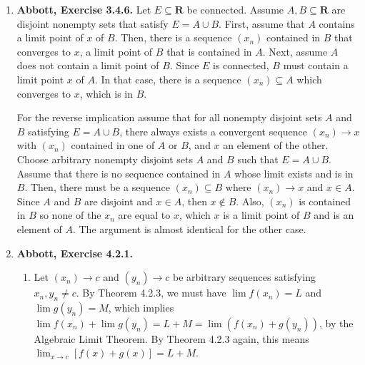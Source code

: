 \documentclass{article}
\makeatletter
\DeclarePairedDelimiter\abs{\lvert}{\rvert}
\let\oldabs\abs
\def\abs{\@ifstar{\oldabs}{\oldabs*}}
\newcommand{\N}{\mathbf{N}}
\newcommand{\R}{\mathbf{R}}
\newcommand{\set}[1]{\{#1\}}
\newcommand{\exc}[2][Abbott]{\item \textbf{#1, Exercise #2.}}
\makeatother
\begin{document}
\begin{enumerate}
\begin{enumerate}
        \item  Each $I_n$ contains some $x_n \in K$, otherwise their intersection with it would be empty, thus it could be finitely covered. Since $(\abs{I_n}) \to 0$, the sequence $(x_n)$ is Cauchy, so it must converge to some $x$. Then, we can use the fact that $K$ is closed to conclude that $x \in K$, by Theorem 3.2.8. Since $K \subseteq I_0$, it follows that $x \in I_0$. Also, since $I_n \subseteq I_0$ for each $n \in \N$, $x \in I_n$.
        
        \item Since $x \in O_{\lambda_0}$ and $O_{\lambda_0}$ is open, there is some $\epsilon_0 > 0$ such that $V_{\epsilon_0}(x) \subseteq O_{\lambda_0}$. Since $\lim \abs{I_n} = 0$, there must be some $N \in \N$ such that $\abs{I_N} < \epsilon_0/2$. But we've already shown that $x \in I_N$, so $I_N \subseteq V_{\epsilon_0}(x) \subseteq O_{\lambda_0}$, therefore $\set{O_{\lambda_0}}$ is a finite subcover for $K \cap I_N$, contradicting the assumption that none of the $K \cap I_n$'s can be finitely subcovered.
    \end{enumerate}
    
    \exc{3.4.6}
    Let $E \subseteq \R$ be connected. Assume $A,B \subseteq \R$ are disjoint nonempty sets that satisfy $E = A \cup B$. First, assume that $A$ contains a limit point of $x$ of $B$. Then, there is a sequence $(x_n)$ contained in $B$ that converges to $x$, a limit point of $B$ that is contained in $A$. Next, assume $A$ does not contain a limit point of $B$. Since $E$ is connected, $B$ must contain a limit point $x$ of $A$. In that case, there is a sequence $(x_n) \subseteq A$ which converges to $x$, which is in $B$.
    
    For the reverse implication assume that for all nonempty disjoint sets $A$ and $B$ satisfying $E = A \cup B$, there always exists a convergent sequence $(x_n) \to x$ with $(x_n)$ contained in one of $A$ or $B$, and $x$ an element of the other. Choose arbitrary nonempty disjoint sets $A$ and $B$ such that $E = A \cup B$. Assume that there is no sequence contained in $A$ whose limit exists and is in $B$. Then, there must be a sequence $(x_n) \subseteq B$ where $(x_n) \to x$ and $x \in A$. Since $A$ and $B$ are disjoint and $x \in A$, then $x \notin B$. Also, $(x_n)$ is contained in $B$ so none of the $x_n$ are equal to $x$, which $x$ is a limit point of $B$ and is an element of $A$. The argument is almost identical for the other case.
    
    \exc{4.2.1}
    \begin{enumerate}
        \item Let $(x_n) \to c$ and $(y_n) \to c$ be arbitrary sequences satisfying $x_n,y_n \neq c$. By Theorem 4.2.3, we must have $\lim{f(x_n)} = L$ and 
        $\lim{g(y_n)} = M$, which implies $\lim{f(x_n)} + \lim {g(y_n)} = L + M = \lim(f(x_n) + g(y_n))$, by the Algebraic Limit Theorem. By Theorem 4.2.3 again, this means $\lim_{x \to c} [f(x)+g(x)] = L + M$.
        

\end{enumerate}
\end{enumerate}
\end{document}
